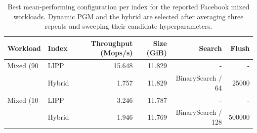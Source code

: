 \begin{table}[h]
\centering
\scriptsize
\setlength{\tabcolsep}{4pt}
\begin{tabular}{llrrrr}
\toprule
Workload & Index & Throughput (Mops/s) & Size (GiB) & Search & Flush \\
\midrule
Mixed (90%
 & LIPP & 15.648 & 11.829 & - & - \\
 & Hybrid & 1.757 & 11.829 & BinarySearch / 64 & 25000 \\
\addlinespace
Mixed (10%
 & LIPP & 3.246 & 11.787 & - & - \\
 & Hybrid & 1.946 & 11.769 & BinarySearch / 128 & 500000 \\
\bottomrule
\end{tabular}
\caption{Best mean-performing configuration per index for the reported Facebook mixed workloads. Dynamic PGM and the hybrid are selected after averaging three repeats and sweeping their candidate hyperparameters.}
\end{table}
